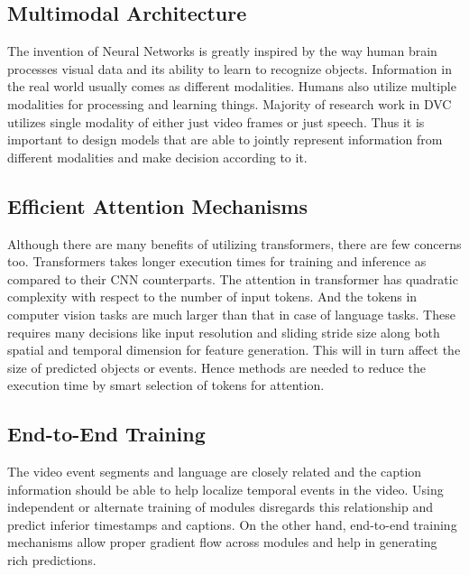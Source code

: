 \subsection{Multimodal Architecture}
\par The invention of Neural Networks is greatly inspired by the way human brain processes visual data and its ability to learn to recognize objects. Information in the real world usually comes as different modalities. Humans also utilize multiple modalities for processing and learning things. Majority of research work in DVC utilizes single modality of either just video frames or just speech. Thus it is important to design models that are able to jointly represent information from different modalities and make decision according to it.

\subsection{Efficient Attention Mechanisms}
\par Although there are many benefits of utilizing transformers, there are few concerns too. Transformers takes longer execution times for training and inference as compared to their CNN counterparts. The attention in transformer has quadratic complexity with respect to the number of input tokens. And the tokens in computer vision tasks are much larger than that in case of language tasks. These requires many decisions like input resolution and sliding stride size along both spatial and temporal dimension for feature generation. This will in turn affect the size of predicted objects or events. Hence methods are needed to reduce the execution time by smart selection of tokens for attention.

\subsection{End-to-End Training}
\par The video event segments and language are closely related and the caption information should be able to help localize temporal events in the video. Using independent or alternate training of modules disregards this relationship and predict inferior timestamps and captions. On the other hand, end-to-end training mechanisms allow proper gradient flow across modules and help in generating rich predictions.
